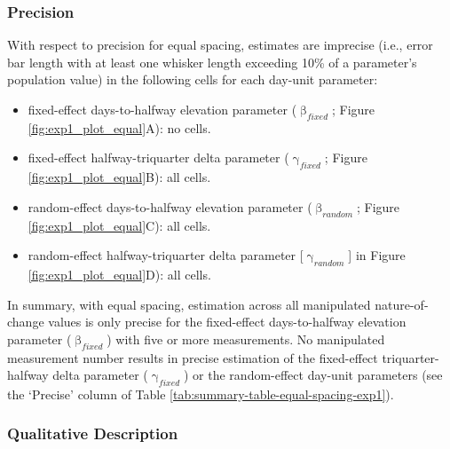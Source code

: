 \documentclass[
12pt, %
twoside,
english]{guelphthesis}
\theoremstyle{definition}
\theoremstyle{definition}
\theoremstyle{definition}
\theoremstyle{definition}
\theoremstyle{remark}
\begin{document}
\hypertarget{precision-equal-exp1}{%
\subsubsection{Precision}\label{precision-equal-exp1}}

With respect to precision for equal spacing, estimates are imprecise (i.e., error bar length with at least one whisker length exceeding 10\% of a parameter's population value) in the following cells for each day-unit parameter:
\begin{itemize}
\tightlist
\item
  fixed-effect days-to-halfway elevation parameter (\(\upbeta_{fixed}\); Figure \ref{fig:exp1_plot_equal}A): no cells.
\item
  fixed-effect halfway-triquarter delta parameter (\(\upgamma_{fixed}\); Figure \ref{fig:exp1_plot_equal}B): all cells.
\item
  random-effect days-to-halfway elevation parameter (\(\upbeta_{random}\); Figure \ref{fig:exp1_plot_equal}C): all cells.
\item
  random-effect halfway-triquarter delta parameter {[}\(\upgamma_{random}\){]} in Figure \ref{fig:exp1_plot_equal}D): all cells.
\end{itemize}
In summary, with equal spacing, estimation across all manipulated nature-of-change values is only precise for the fixed-effect days-to-halfway elevation parameter (\(\upbeta_{fixed}\)) with five or more measurements. No manipulated measurement number results in precise estimation of the fixed-effect triquarter-halfway delta parameter (\(\upgamma_{fixed}\)) or the random-effect day-unit parameters (see the `Precise' column of Table \ref{tab:summary-table-equal-spacing-exp1}).

\hypertarget{qualitative-equal-exp1}{%
\subsubsection{Qualitative Description}\label{qualitative-equal-exp1}}
\end{document}
